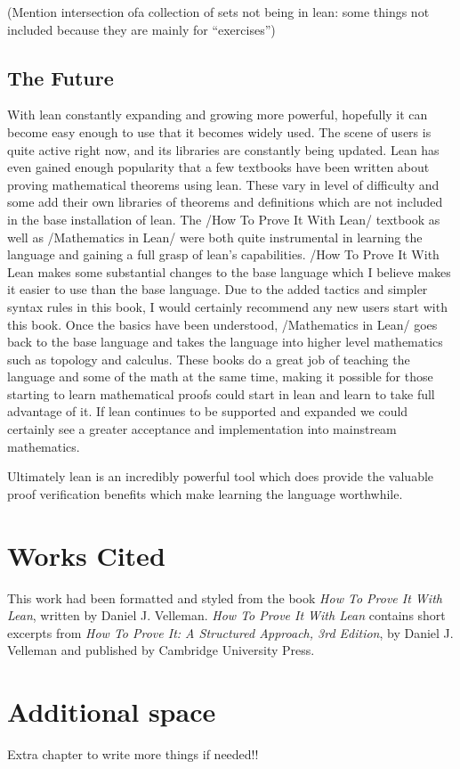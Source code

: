 \documentclass[
  letterpaper,
]{scrreprt}
\theoremstyle{remark}
\begin{document}
(Mention intersection ofa collection of sets not being in lean: some
things not included because they are mainly for ``exercises'')

\hypertarget{the-future}{%
\section{The Future}\label{the-future}}

With lean constantly expanding and growing more powerful, hopefully it
can become easy enough to use that it becomes widely used. The scene of
users is quite active right now, and its libraries are constantly being
updated. Lean has even gained enough popularity that a few textbooks
have been written about proving mathematical theorems using lean. These
vary in level of difficulty and some add their own libraries of theorems
and definitions which are not included in the base installation of lean.
The /How To Prove It With Lean/ textbook as well as /Mathematics in
Lean/ were both quite instrumental in learning the language and gaining
a full grasp of lean's capabilities. /How To Prove It With Lean makes
some substantial changes to the base language which I believe makes it
easier to use than the base language. Due to the added tactics and
simpler syntax rules in this book, I would certainly recommend any new
users start with this book. Once the basics have been understood,
/Mathematics in Lean/ goes back to the base language and takes the
language into higher level mathematics such as topology and calculus.
These books do a great job of teaching the language and some of the math
at the same time, making it possible for those starting to learn
mathematical proofs could start in lean and learn to take full advantage
of it. If lean continues to be supported and expanded we could certainly
see a greater acceptance and implementation into mainstream mathematics.

Ultimately lean is an incredibly powerful tool which does provide the
valuable proof verification benefits which make learning the language
worthwhile.


\hypertarget{works-cited}{%
\chapter{Works Cited}\label{works-cited}}

This work had been formatted and styled from the book \emph{How To Prove
It With Lean}, written by Daniel J. Velleman. \emph{How To Prove It With
Lean} contains short excerpts from \emph{How To Prove It: A Structured
Approach, 3rd Edition}, by Daniel J. Velleman and published by Cambridge
University Press.


\hypertarget{additional-space}{%
\chapter{Additional space}\label{additional-space}}

Extra chapter to write more things if needed!!
\end{document}
